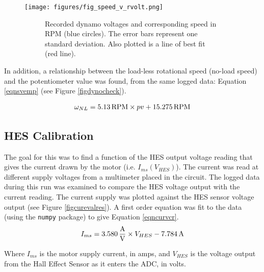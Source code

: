 \documentclass[twoside,a4]{report}
\begin{document}
	
	\begin{figure}[!htb]
		\centering
		\texttt{[image: figures/fig\_speed\_v\_rvolt.png]}
		\caption{Dynamo Calibration Results}
		\label{figspeedvrvolt}
		\begin{subfigure}{0.9\textwidth}
			\footnotesize Recorded dynamo voltages and corresponding speed in RPM (blue circles). The error bars represent one standard deviation. Also plotted is a line of best fit (red line).
		\end{subfigure}
	\end{figure}
	
	\noindent
	In addition, a relationship between the load-less rotational speed (no-load speed) and the potentiometer value was found, from the same logged data: Equation \ref{eqnsvemp} (see Figure \ref{figdynocheck}).
	
	\begin{equation}
	\omega_{NL} = 5.13 {\rm \, RPM} \times pv + 15.275 {\rm \, RPM}
	\label{eqnsvemp}
	\end{equation}
	
	
	\subsection*{HES Calibration}
	The goal for this was to find a function of the HES output voltage reading that gives the current drawn by the motor (i.e. \(I_{ms} ({V_{HES}})\)). The current was read at different supply voltages from a multimeter placed in the circuit. The logged data during this run was examined to compare the HES voltage output with the current reading. The current supply was plotted against the HES sensor voltage output (see Figure \ref{figcurevalres}). A first order equation was fit to the data (using the \texttt{numpy} package) to give Equation \ref{eqncurvcr}.
	\begin{equation}
	I_{ms} = 3.580 {\rm \, \frac{A}{V}} \times {V_{HES}} - 7.784 {\rm \, A}
	\label{eqncurvcr}
	\end{equation}
	
	
	\noindent
	Where \(I_{ms}\) is the motor supply current, in amps, and \(V_{HES}\) is the voltage output from the Hall Effect Sensor as it enters the ADC, in volts.
	
\end{document}
